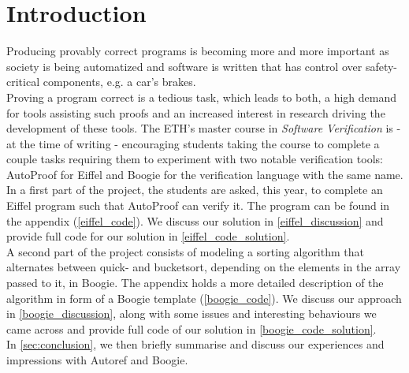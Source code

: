 \section{Introduction}
Producing provably correct programs is becoming more and more important as society is being automatized and software is written that has control over safety-critical components, e.g. a car's brakes.\\

Proving a program correct is a tedious task, which leads to both, a high demand for tools assisting such proofs and an increased interest in research driving the development of these tools. The ETH's master course in \emph{Software Verification} is - at the time of writing - encouraging students taking the course to complete a couple tasks requiring them to experiment with two notable verification tools: AutoProof\cite{autoproof} for Eiffel and Boogie\cite{boogie} for the verification language with the same name.\\

In a first part of the project, the students are asked, this year, to complete an Eiffel program such that AutoProof can verify it. The program can be found in the appendix (\ref{eiffel_code}). We discuss our solution in \autoref{eiffel_discussion} and provide full code for our solution in \autoref{eiffel_code_solution}.\\

A second part of the project consists of modeling a sorting algorithm that alternates between quick- and bucketsort, depending on the elements in the array passed to it, in Boogie. The appendix holds a more detailed description of the algorithm in form of a Boogie template (\ref{boogie_code}). We discuss our approach in \autoref{boogie_discussion}, along with some issues and interesting behaviours we came across and provide full code of our solution in \autoref{boogie_code_solution}.\\

In \autoref{sec:conclusion}, we then briefly summarise and discuss our experiences and impressions with Autoref and Boogie.